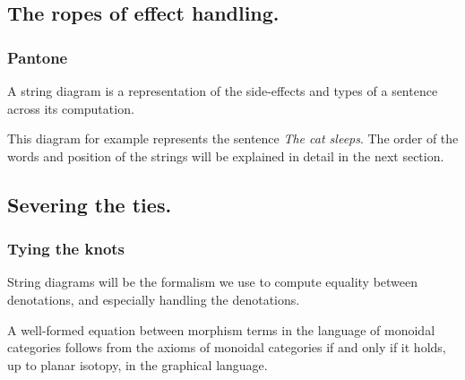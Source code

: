 \documentclass[math, english, info]{beamercours}
\begin{document}
\subsection{The ropes of effect handling.}
\begin{frame}[allowframebreaks]
	\frametitle{Pantone}
	A string diagram is a representation of the side-effects and types of a
	sentence across its computation.

	\begin{center}
		\begin{minipage}[c]{.45\textwidth}
		\end{minipage}
    \begin{minipage}[c]{.45\textwidth}
      This diagram for example represents the sentence \textsl{The cat sleeps}.
    	The order of the words and position of the strings will be explained in
    	detail in the next section.
    \end{minipage}
	\end{center}

\end{frame}

\subsection{Severing the ties.}
\begin{frame}
	\frametitle{Tying the knots}
	String diagrams will be the formalism we use to compute equality between
	denotations, and especially handling the denotations.
	\begin{thm}
		\label{thm:isotopy}
		A well-formed equation between morphism terms in the language of monoidal
		categories follows from the axioms of monoidal categories if and only if it
		holds, up to planar isotopy, in the graphical language.
	\end{thm}
\end{frame}
\end{document}
